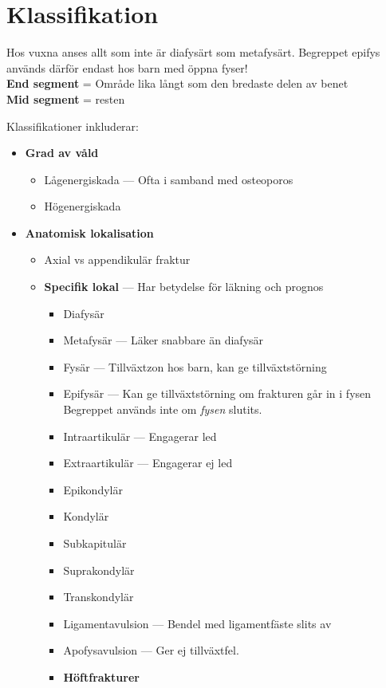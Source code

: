 \documentclass[
  letterpaper,
  DIV=11,
  numbers=noendperiod]{scrreport}
\providecommand{\tightlist}{%
  \setlength{\itemsep}{0pt}\setlength{\parskip}{0pt}}\usepackage{longtable,booktabs,array}
\begin{document}
\hypertarget{klassifikation}{%
\section{Klassifikation}\label{klassifikation}}

Hos vuxna anses allt som inte är diafysärt som metafysärt. Begreppet
epifys används därför endast hos barn med öppna fyser!\\
\textbf{End segment} = Område lika långt som den bredaste delen av
benet\\
\textbf{Mid segment} = resten

Klassifikationer inkluderar:

\begin{itemize}
\tightlist
\item
  \textbf{Grad av våld}

  \begin{itemize}
  \tightlist
  \item
    Lågenergiskada --- Ofta i samband med osteoporos
  \item
    Högenergiskada
  \end{itemize}
\item
  \textbf{Anatomisk lokalisation}

  \begin{itemize}
  \tightlist
  \item
    Axial vs appendikulär fraktur
  \item
    \textbf{Specifik lokal} --- Har betydelse för läkning och prognos

    \begin{itemize}
    \tightlist
    \item
      Diafysär
    \item
      Metafysär --- Läker snabbare än diafysär
    \item
      Fysär --- Tillväxtzon hos barn, kan ge tillväxtstörning
    \item
      Epifysär --- Kan ge tillväxtstörning om frakturen går in i fysen\\
      Begreppet används inte om \emph{fysen} slutits.
    \item
      Intraartikulär --- Engagerar led
    \item
      Extraartikulär --- Engagerar ej led
    \item
      Epikondylär
    \item
      Kondylär\\
    \item
      Subkapitulär
    \item
      Suprakondylär
    \item
      Transkondylär
    \item
      Ligamentavulsion --- Bendel med ligamentfäste slits av
    \item
      Apofysavulsion --- Ger ej tillväxtfel.
    \item
      \textbf{Höftfrakturer}


\end{itemize}
\end{itemize}
\end{itemize}
\end{document}

